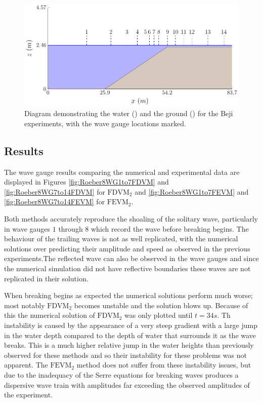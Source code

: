 \begin{figure}
	\centering
	\includegraphics[width=\textwidth]{./chp6/figures/Experiment/Roeber/Trial8/WaveTank.pdf}
	\caption{Diagram demonstrating the water () and the ground  () for the Beji experiments, with the wave gauge locations marked.}
	\label{fig:RoeberWT}
\end{figure}

\subsection{Results}

The wave gauge results comparing the numerical and experimental data are displayed in Figures \ref{fig:Roeber8WG1to7FDVM} and \ref{fig:Roeber8WG7to14FDVM} for $\text{FDVM}_2$ and \ref{fig:Roeber8WG1to7FEVM} and \ref{fig:Roeber8WG7to14FEVM} for $\text{FEVM}_2$.

Both methods accurately reproduce the shoaling of the solitary wave, particularly in wave gauges $1$ through $8$ which record the wave before breaking begins. The behaviour of the trailing waves is not as well replicated, with the numerical solutions over predicting their amplitude and speed as  observed in the previous experiments.The reflected wave can also be observed in the wave gauges and since the numerical simulation did not have reflective boundaries these waves are not replicated in their solution.

When breaking begins as expected the numerical solutions perform much worse; most notably $\text{FDVM}_2$ becomes unstable and the solution blows up. Because of this the numerical solution of $\text{FDVM}_2$ was only plotted until $t = 34s$. Th instability is caused by the appearance of a very steep gradient with a large jump in the water depth compared to the depth of water that surrounds it as the wave breaks. This is a much higher relative jump in the water heights than previously observed for these methods \cite{Pitt-2018-61} and so their instability for these problems was not apparent. The $\text{FEVM}_2$ method does not suffer from these instability issues, but due to the inadequacy of the Serre equations for breaking waves produces a dispersive wave train with amplitudes far exceeding the observed amplitudes of the experiment. 

